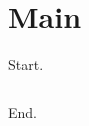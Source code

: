 \documentclass{article}
\begin{document}
\section{Main}
Start.

% 
\begin{verbatim}

\end{verbatim}





End.
\end{document}
